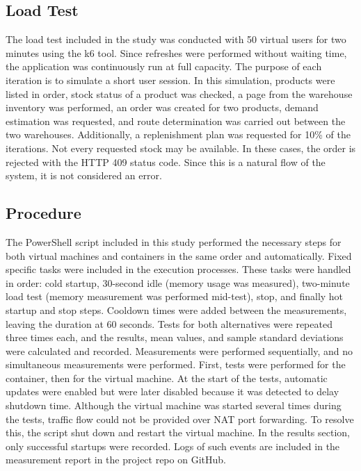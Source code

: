\documentclass[conference,a4paper]{IEEEtran}
\begin{document}
\subsection{Load Test}
The load test included in the study was conducted with 50 virtual users for two minutes using the k6 tool. Since refreshes were performed without waiting time, the application was continuously run at full capacity. The purpose of each iteration is to simulate a short user session. In this simulation, products were listed in order, stock status of a product was checked, a page from the warehouse inventory was performed, an order was created for two products, demand estimation was requested, and route determination was carried out between the two warehouses. Additionally, a replenishment plan was requested for 10\% of the iterations. Not every requested stock may be available. In these cases, the order is rejected with the HTTP 409 status code. Since this is a natural flow of the system, it is not considered an error.

\subsection{Procedure}
The PowerShell script included in this study performed the necessary steps for both virtual machines and containers in the same order and automatically. Fixed specific tasks were included in the execution processes. These tasks were handled in order: cold startup, 30-second idle (memory usage was measured), two-minute load test (memory measurement was performed mid-test), stop, and finally hot startup and stop steps. Cooldown times were added between the measurements, leaving the duration at 60 seconds. Tests for both alternatives were repeated three times each, and the results, mean values, and sample standard deviations were calculated and recorded. Measurements were performed sequentially, and no simultaneous measurements were performed. First, tests were performed for the container, then for the virtual machine. At the start of the tests, automatic updates were enabled but were later disabled because it was detected to delay shutdown time. Although the virtual machine was started several times during the tests, traffic flow could not be provided over NAT port forwarding. To resolve this, the script shut down and restart the virtual machine. In the results section, only successful startups were recorded. Logs of such events are included in the measurement report in the project repo on GitHub.
\end{document}
